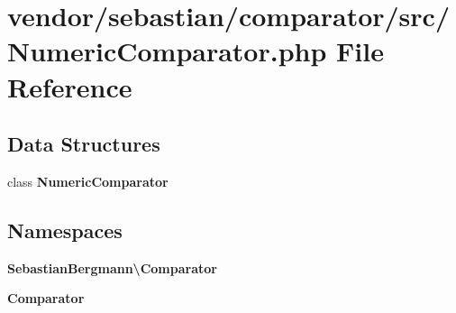 \section{vendor/sebastian/comparator/src/\+Numeric\+Comparator.php File Reference}
\label{_numeric_comparator_8php}
\subsection*{Data Structures}
\begin{DoxyCompactItemize}
\item 
class {\bf Numeric\+Comparator}
\end{DoxyCompactItemize}
\subsection*{Namespaces}
\begin{DoxyCompactItemize}
\item 
 {\bf Sebastian\+Bergmann\textbackslash{}\+Comparator}
\item 
 {\bf Comparator}
\end{DoxyCompactItemize}
